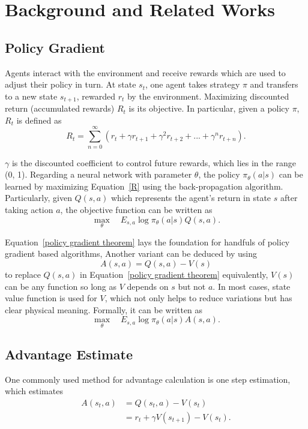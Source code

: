 \documentclass{article}
\begin{document}
\section{Background and Related Works}
\subsection{Policy Gradient}
Agents interact with the environment and receive rewards  which are used to adjust their policy in turn. At state ${s_t}$, one agent takes strategy $\pi$ and transfers to  a new state ${s_{t+1}}$, rewarded ${r_t}$ by the environment. Maximizing discounted return (accumulated rewards) $R_t$ is its objective. In particular, given a policy $\pi$,  $R_t$ is defined as
\begin{equation}\label{R}
R_t=\sum_{n=0}^{\infty} (r_t+\gamma{r_{t+1}}+\gamma^2{r_{t+2}}+...+\gamma^n{r_{t+n}}).
\end{equation}

$\gamma$ is the discounted coefficient to control future rewards, which lies in the range (0, 1). Regarding a neural network with parameter $\theta$, the policy $\pi_\theta(a|s)$ can be learned by maximizing Equation~\ref{R} using the back-propagation algorithm. Particularly, given $Q{(s,a)}$ which represents the agent's return in state $s$ after taking action $a$, the objective function can be written as
\begin{equation}\label{policy gradient theorem}
\max_\theta \quad E_{s,a} \log \pi_\theta(a|s) Q(s,a).
\end{equation}

Equation~\ref{policy gradient theorem} lays the foundation for handfuls of policy gradient based algorithms,
Another variant  can be deduced by using  
\begin{equation}\label{advantage}
A(s,a) = Q(s,a)-V(s)
\end{equation}
to replace $Q(s,a)$ in Equation~\ref{policy gradient theorem} equivalently, $V(s)$ can be any function so long as  $V$ depends on   $s$ but not $a$. In most cases, state value function is used for $V$, which not only helps to reduce variations but has clear physical meaning. Formally, it can be written as
\begin{equation}\label{policy gradient theorem with advantage}
\max_\theta \quad E_{s,a} \log \pi_\theta(a|s) A(s,a).
\end{equation}

\subsection{Advantage Estimate}
One commonly used method for advantage calculation is one step estimation, which estimates 
\begin{equation}
\begin{split}
A(s_t,a) &= Q(s_t,a) - V(s_t) \\
&=r_t + \gamma V(s_{t+1})-V(s_t).
\end{split}
\end{equation}
\end{document}
